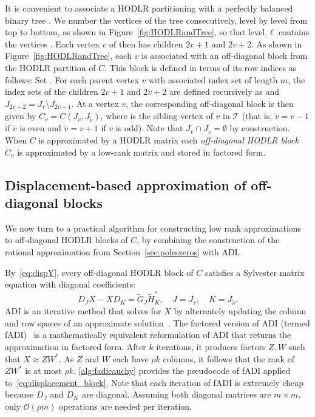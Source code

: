 \documentclass[final,reqno,onefignum,onetabnum]{siamart190516}
\begin{document}
It is convenient to associate a HODLR partitioning with a perfectly balanced binary tree . We number the vertices of the tree consecutively, level by level from top to bottom, as shown in Figure~\ref{fig:HODLRandTree}, so that level $\ell$  contains the vertices . Each vertex $v$ of  then has children $2v+1$ and $2v+2$. As shown in Figure~\ref{fig:HODLRandTree}, each $v$ is associated with an off-diagonal block  from the HODLR partition of ${C}$.  This block is defined in terms of its row indices as follows:
Set . For each parent vertex $v$ with associated index set  of length $m$, the index sets of the children $2v+1$ and $2v+2$ are defined recursively as  and $J_{2v\!+\!2} = J_v \setminus J_{2v\!+\!1}$. At a vertex $v$, the corresponding off-diagonal block is then given by ${C}_{v} = {C}(J_v, J_{\widetilde{v}})$, where  is the sibling vertex of $v$ in $\mathcal{T}$ (that is, $\widetilde v = v \!-\!1$ if $v$ is even and $\widetilde v = v\!+\!1$ if $v$ is odd).  Note that $J_v \cap J_{\widetilde{v}} = \emptyset$ by construction. When $C$ is approximated by a HODLR matrix each \emph{off-diagonal HODLR block} ${C}_{v}$ is approximated by a low-rank matrix and stored in factored form.


\subsection{Displacement-based approximation of off-diagonal blocks}
\label{sec:HODLR_factorization}

We now turn to a practical algorithm for constructing low rank approximations to off-diagonal HODLR blocks of $C$, by combining the construction of the rational approximation from Section~\ref{sec:poleszeros} with ADI.

By~\eqref{eq:dispY}, every off-diagonal HODLR block  of $C$ satisfies a Sylvester matrix equation with diagonal coefficients:
\begin{equation} 
\label{eq:displacement_block}
D_JX - XD_K = \widetilde{G}_J\widetilde{H}_K^*, \quad J = J_v, \quad K = J_{\widetilde v}.
\end{equation} 
ADI is an iterative method that solves for $X$ by alternately updating the column and row spaces of an approximate solution~\cite{lu1991solution, peaceman1955numerical}.  
The factored version of ADI (termed fADI)~\cite{benner2009adi,li2002low} is a mathematically equivalent reformulation of ADI that returns the approximation in factored form. After $k$ iterations, it produces factors $Z,W$ such that $X \approx ZW^*$. As $Z$ and $W$ each have $\rho k$ columns, it follows that the rank of $ZW^*$ is at most $\rho k$. 
\cref{alg:fadicauchy} provides the pseudocode of fADI applied to~\eqref{eq:displacement_block}. Note that each 
iteration of fADI is extremely cheap because $D_J$ and $D_K$ are diagonal. Assuming both diagonal matrices are $m\times m$, only $\mathcal{O}(\rho m)$ operations are needed per iteration.
\end{document}
